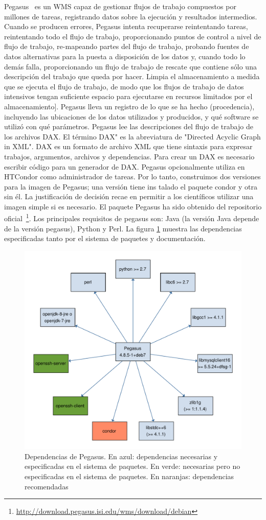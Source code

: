 Pegasus~\cite{DBLP:journals/fgcs/DeelmanVJRCMMCS15} es un WMS capaz de gestionar flujos de trabajo compuestos por millones de tareas, registrando datos sobre la ejecución y resultados intermedios. 
Cuando se producen errores, Pegasus intenta recuperarse reintentando tareas, reintentando todo el flujo de trabajo, proporcionando puntos de control a nivel de flujo de trabajo, re-mapeando partes del flujo de trabajo, probando fuentes de datos alternativas para la puesta a disposición de los datos y, cuando todo lo demás falla, proporcionando un flujo de trabajo de rescate que contiene sólo una descripción del trabajo que queda por hacer. Limpia el almacenamiento a medida que se ejecuta el flujo de trabajo, de modo que los flujos de trabajo de datos intensivos tengan suficiente espacio para ejecutarse en recursos limitados por el almacenamiento]. Pegasus lleva un registro de lo que se ha hecho (procedencia), incluyendo las ubicaciones de los datos utilizados y producidos, y qué software se utilizó con qué parámetros.
Pegasus lee las descripciones del flujo de trabajo de los archivos DAX. El término DAX" es la abreviatura de "Directed Acyclic Graph in XML". DAX es un formato de archivo XML que tiene sintaxis para expresar trabajos, argumentos, archivos y dependencias. Para crear un DAX es necesario escribir código para un generador de DAX. 
Pegasus opcionalmente utiliza en HTCondor como administrador de tareas. Por lo tanto, construimos dos versiones para la imagen de Pegasus; una versión tiene ins
talado el paquete condor y otra sin él. La justificación de decisión recae en permitir a los científicos utilizar una imagen simple si es necesario.
El paquete Pegasus ha sido obtenido del repositorio oficial~\footnote{\url{http://download.pegasus.isi.edu/wms/download/debian}}.
Los principales requisitos de pegasus son: Java (la versión Java depende de la versión pegasus), Python y Perl. La figura \ref{fig:pegasus-deps} muestra las dependencias especificadas tanto por el sistema de paquetes y documentación.

\begin{figure}[t]
\centering
\includegraphics[width=.5\textwidth]{Figures/pegasus-deps}
\caption[Dependencias Pegasus]{Dependencias de Pegasus. En azul: dependencias necesarias y especificadas en el sistema de paquetes. En verde: necesarias pero no especificadas en el sistema de paquetes. En naranjas: dependencias recomendadas}
\label{fig:pegasus-deps}
\end{figure}

